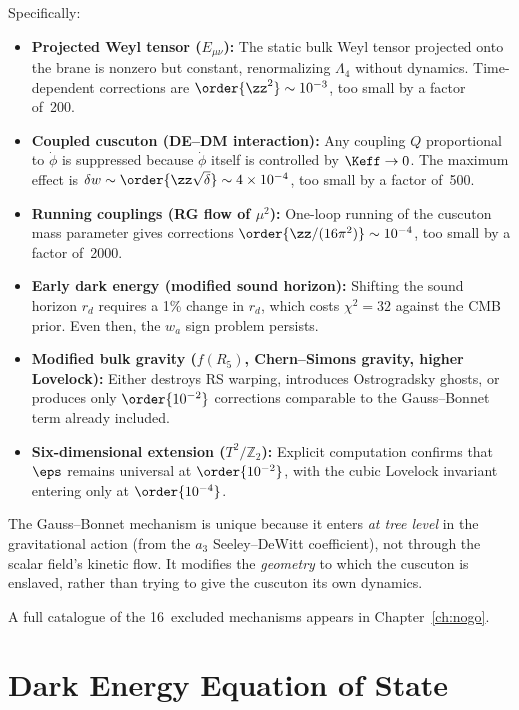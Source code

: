 Specifically:
\begin{itemize}
\item \textbf{Projected Weyl tensor ($E_{\mu\nu}$):} The static bulk Weyl tensor projected onto the brane is nonzero but constant, renormalizing $\Lambda_4$ without dynamics. Time-dependent corrections are $\order{\zz^2} \sim 10^{-3}$, too small by a factor of~200.

\item \textbf{Coupled cuscuton (DE--DM interaction):} Any coupling $Q$ proportional to $\dot\phi$ is suppressed because $\dot\phi$ itself is controlled by $\Keff \to 0$. The maximum effect is $\delta w \sim \order{\zz\sqrt{\delta}} \sim 4 \times 10^{-4}$, too small by a factor of~500.

\item \textbf{Running couplings (RG flow of $\mu^2$):} One-loop running of the cuscuton mass parameter gives corrections $\order{\zz/(16\pi^2)} \sim 10^{-4}$, too small by a factor of~2000.

\item \textbf{Early dark energy (modified sound horizon):} Shifting the sound horizon $r_d$ requires a 1\% change in $r_d$, which costs $\chi^2 = 32$ against the CMB prior. Even then, the $w_a$ sign problem persists.

\item \textbf{Modified bulk gravity ($f(R_5)$, Chern--Simons gravity, higher Lovelock):} Either destroys RS warping, introduces Ostrogradsky ghosts, or produces only $\order{10^{-2}}$ corrections comparable to the Gauss--Bonnet term already included.

\item \textbf{Six-dimensional extension ($T^2/\mathbb{Z}_2$):} Explicit computation confirms that $\eps$ remains universal at $\order{10^{-2}}$, with the cubic Lovelock invariant entering only at $\order{10^{-4}}$.
\end{itemize}

The Gauss--Bonnet mechanism is unique because it enters \emph{at tree level} in the gravitational action (from the $a_3$ Seeley--DeWitt coefficient), not through the scalar field's kinetic flow. It modifies the \emph{geometry} to which the cuscuton is enslaved, rather than trying to give the cuscuton its own dynamics.

A full catalogue of the 16~excluded mechanisms appears in Chapter~\ref{ch:nogo}.


\section{Dark Energy Equation of State}
\label{sec:1-eos}

